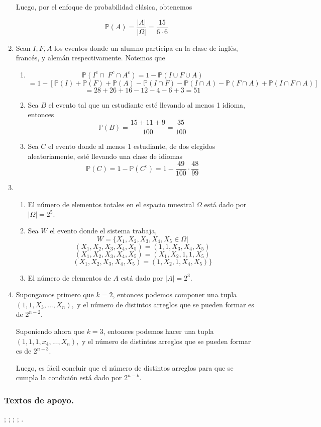 \begin{enumerate}
Luego, por el enfoque de probabilidad clásica, obtenemos

\[ \mathbb{P}(A) = \frac{|A|}{|\Omega|} = \frac{15}{6 \cdot 6}\]

\item Sean $I,F,A$ los eventos donde un alumno participa en la clase de inglés, francés, y alemán respectivamente. Notemos que

\begin{enumerate}
	\item \[ \mathbb{P}(I^c \cap\ F^c \cap A^c)= 1 - \mathbb{P}(I \cup F \cup A)\]
	\[= 1- [ \mathbb{P}(I) + \mathbb{P}(F) + \mathbb{P}(A) - \mathbb{P}(I \cap F) - \mathbb{P}(I \cap A) - \mathbb{P}(F \cap A) + \mathbb{P}(I \cap F \cap A)]\] 
	\[= 28 + 26 +16 - 12 - 4-6 +3 = 51\]
	
	\item Sea $B$ el evento tal que un estudiante esté llevando al menos 1 idioma, entonces
	\[ \mathbb{P}(B) = \frac{15+11+9}{100} = \frac{35}{100}\]
	
	\item Sea $C$ el evento donde al menos 1 estudiante, de dos elegidos aleatoriamente, esté llevando una clase de idiomas
	\[ \mathbb{P}(C)= 1- \mathbb{P}(C^c) = 1 - \frac{49}{100} \cdot \frac{48}{99}\] 
\end{enumerate}

\item \begin{enumerate}
	\item El número de elementos totales en el espacio muestral $\Omega$ está dado por $|\Omega| = 2^5.$
	\item Sea $W$ el evento donde el sistema trabaja,
	\[ W = \{X_1, X_2, X_3, X_4, X_5 \in \Omega | \]
	\[ (X_1, X_2, X_3, X_4, X_5) = (1,1,X_3, X_4, X_5)\]
	\[ (X_1, X_2, X_3, X_4, X_5) = (X_1,X_2,1, 1, X_5)\]
	\[ (X_1, X_2, X_3, X_4, X_5) = (1,X_2,1, X_4, X_5) \}\]
	
	\item El número de elementos de $A$ está dado por $|A| = 2^3.$
\end{enumerate}

\item Supongamos primero que $k=2$, entonces podemos componer una tupla $(1,1,X_3,...,X_n),$ y el número de distintos arreglos que se pueden formar es de $2^{n-2}.$

Suponiendo ahora que $k=3$, entonces podemos hacer una tupla $(1,1,1,x_4,...,X_n),$ y el número de distintos arreglos que se pueden formar es de $2^{n-3}.$

Luego, es fácil concluir que el número de distintos arreglos para que se cumpla la condición está dado por $2^{n-k}.$







\end{enumerate}

\subsubsection*{Textos de apoyo.} 
; ; ; ; .
